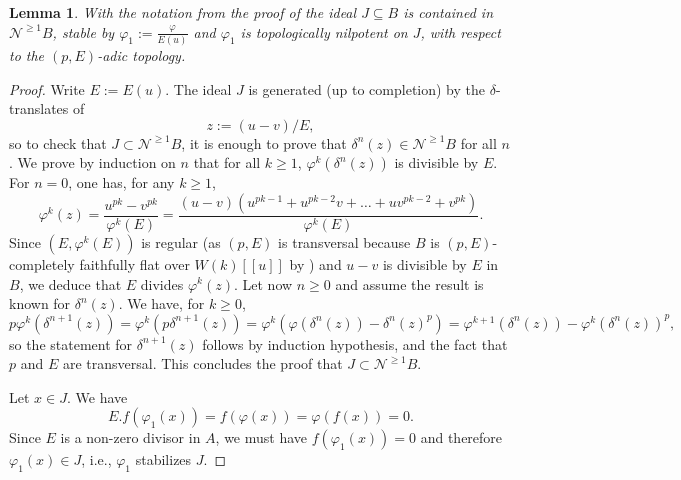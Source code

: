 \documentclass{amsart}
\theoremstyle{plain}
\newtheorem{lemma}[theorem]{Lemma}
\theoremstyle{definition}
\newcommand{\red}[1]{{\color{black} #1}}
\begin{document}
\begin{lemma}
\label{sec:comp-case-mathc-lemma-top-nilpotent-J} With the notation from the proof of  the ideal $J\subseteq B$ is contained in $\mathcal{N}^{\geq 1} B$, stable by $\varphi_1:=\frac{\varphi}{E(u)}$ and $\varphi_1$ is topologically nilpotent on $J$, with respect to the $(p,E)$-adic topology. 
\end{lemma}
\begin{proof}
  Write $E:=E(u)$.
  The ideal $J$ is generated (up to completion) by the $\delta$-translates of
  $$
  z:=(u-v)/E,
  $$
  so to check that $J \subset \mathcal{N}^{\geq 1} B$, it is enough to prove that $\delta^n (z) \in \mathcal{N}^{\geq 1} B$ for all $n$. We prove by induction on $n$ that for all \red{$k \geq 1$}, $\varphi^k(\delta^n(z))$ is divisible by $E$. For $n=0$, one has, for any $k\geq 1$,
\[ \varphi^k(z)= \frac{u^{pk}-v^{pk}}{\varphi^k(E)}=\frac{(u-v)(u^{pk-1} + u^{pk-2}v + \dots + uv^{pk-2} + v^{pk})}{\varphi^k(E)}. \]
Since $(E,\varphi^k(E))$ is regular (as $(p,E)$ is transversal because $B$ is $(p,E)$-completely faithfully flat over $W(k)[[u]]$ by \cite[Proposition 3.13]{bhatt_scholze_prisms_and_prismatic_cohomology}) and $u-v$ is divisible by $E$ in $B$, we deduce that $E$ divides $\varphi^k(z)$. Let now $n\geq 0$ and assume the result is known for $\delta^n(z)$. We have, for $k\geq 0$, 
\[ p\varphi^k(\delta^{n+1}(z)) =\varphi^k(p\delta^{n+1}(z))= \varphi^k(\varphi(\delta^{n}(z))-\delta^n(z)^p) =\varphi^{k+1}(\delta^n(z)) - \varphi^k(\delta^n(z))^p, \]
so the statement for $\delta^{n+1}(z)$ follows by induction hypothesis, and the fact that $p$ and $E$ are transversal. This concludes the proof that $J \subset \mathcal{N}^{\geq 1} B$. 

Let $x \in J$. We have
\[ E.f(\varphi_1(x)) = f(\varphi(x)) =\varphi(f(x))=0. \]
Since $E$ is a non-zero divisor in $A$, we must have $f(\varphi_1(x))=0$ and therefore $\varphi_1(x) \in J$, i.e., $\varphi_1$ stabilizes $J$.


\end{proof}
\end{document}
